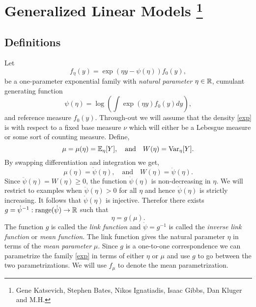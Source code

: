 \section{Generalized Linear Models \footnote{Gene Katsevich, Stephen Bates, Nikos Ignatiadis, Isaac Gibbs, Dan Kluger and M.H.}}\label{sec:GLM}

\subsection{Definitions}
Let
\begin{equation}\label{exp}
    f_\eta(y) =  \exp\left(\eta y - \psi(\eta)\right)f_0(y), 
\end{equation}
be a one-parameter exponential family with \emph{natural parameter} $\eta \in \mathbb{R}$, cumulant generating function 
\[
    \psi(\eta) = \log\left(\int \exp(\eta y)f_0(y)dy\right),
\]
and reference measure $f_0(y)$. Through-out we will assume that the density \eqref{exp} is with respect to a fixed base measure $\nu$ which will either be a Lebesgue measure or some sort of counting measure. Define,
\[\mu=\mu(\eta) = {\mathbb E}_\eta[Y], \quad \text{and}\quad  W(\eta) = \mathrm{Var}_\eta[Y]. \]
By swapping differentiation and integration we get,
\[\mu(\eta) = \dot{\psi}(\eta), \quad \text{and}\quad  W(\eta) = \ddot{\psi}(\eta). \]
Since $\ddot{\psi}(\eta) = W(\eta) \ge 0$, the function $\dot{\psi}(\eta)$ is non-decreasing in $\eta$. We will restrict to examples when $\ddot{\psi}(\eta) >0$ for all $\eta$ and hence $\dot{\psi}(\eta)$ is strictly increasing. It follows that $\dot{\psi}(\eta)$ is injective. Therefor there exists $g = \dot{\psi}^{-1} : \mathrm{range}(\dot{\psi}) \to \mathbb{R}$ such that
\[\eta = g(\mu). \]
The function $g$ is called the \emph{link function} and $\dot{\psi} = g^{-1}$ is called the \emph{inverse link function} or \emph{mean function}. The link function gives the natural parameter $\eta$ in terms of the \emph{mean parameter} $\mu$. Since $g$ is a one-to-one correspondence we can parametrize the family \eqref{exp} in terms of either $\eta$ or $\mu$ and use $g$ to go between the two parametrizations. We will use $f_{\mu}$ to denote the mean parametrization.

